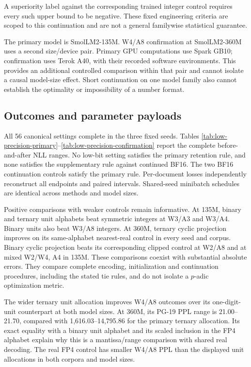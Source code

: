 \documentclass[11pt]{article}
\begin{document}
A superiority label against the corresponding trained integer control
requires every such upper bound to be negative. These fixed engineering
criteria are scoped to this continuation and are not a general familywise
statistical guarantee.

The primary model is SmolLM2-135M. W4/A8 confirmation at SmolLM2-360M uses
a second size/device pair. Primary GPU computations use Spark GB10;
confirmation uses Terok A40, with their recorded software environments.
This provides an additional controlled comparison within that pair and
cannot isolate a causal model-size effect. Short continuation on one model
family also cannot establish the optimality or impossibility of a number
format.

\subsection{Outcomes and parameter payloads}

All 56 canonical settings complete in the three fixed seeds. Tables
\ref{tab:low-precision-primary}--\ref{tab:low-precision-confirmation}
report the complete before-and-after NLL ranges. No low-bit setting satisfies
the primary retention rule, and none satisfies the supplementary rule
against continued BF16. The two BF16 continuation controls satisfy the
primary rule. Per-document losses independently reconstruct all endpoints
and paired intervals. Shared-seed minibatch schedules are identical across
methods and model sizes.

Positive comparisons with weaker controls remain informative. At 135M,
binary and ternary unit alphabets beat symmetric integers at W3/A3 and
W3/A4. Binary units also beat W3/A8 integers. At 360M, ternary cyclic
projection improves on its same-alphabet nearest-real control in every
seed and corpus. Binary cyclic projection beats its corresponding clipped
control at W2/A8 and at mixed W2/W4, A4 in 135M. These comparisons coexist
with substantial absolute errors. They compare complete encoding,
initialization and continuation procedures, including the stated tie
rules, and do not isolate a \(p\)-adic optimization metric.

The wider ternary unit allocation improves W4/A8 outcomes over its
one-digit-unit counterpart at both model sizes. At 360M, its PG-19 PPL
range is 21.00--21.70, compared with 1,616.03--14,795.86 for the primary
ternary allocation. Its exact equality with a binary unit alphabet and
its scaled inclusion in the FP4 alphabet explain why this is a
mantissa/range comparison with shared real decoding. The real FP4 control
has smaller W4/A8 PPL than the displayed unit allocations in both corpora
and model sizes.
\end{document}
